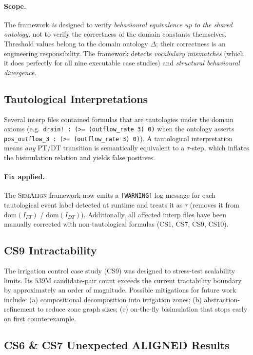 \documentclass[10pt,a4paper]{article}
\newcommand{\tool}{\textsc{SemAlign}}
\begin{document}
\paragraph{Scope.}
The framework \emph{is} designed to verify \emph{behavioural equivalence up
to the shared ontology}, not to verify the correctness of the domain
constants themselves. Threshold values belong to the domain ontology $\Delta$;
their correctness is an engineering responsibility. The framework detects
\emph{vocabulary mismatches} (which it does perfectly for all nine
executable case studies) and \emph{structural behavioural divergence}.

\subsection{Tautological Interpretations}

Several interp files contained formulas that are tautologies under
the domain axioms (e.g.\ \texttt{drain! : (>= (outflow\_rate 3) 0)} when
the ontology asserts \texttt{pos\_outflow\_3 : (>= (outflow\_rate 3) 0)}).
A tautological interpretation means \emph{any} PT/DT transition is
semantically equivalent to a $\tau$-step, which inflates the bisimulation
relation and yields false positives.

\paragraph{Fix applied.}
The \tool{} framework now emits a \texttt{[WARNING]} log message for each
tautological event label detected at runtime and treats it as $\tau$
(removes it from $\text{dom}(I_{PT})$ / $\text{dom}(I_{DT})$).
Additionally, all affected interp files have been manually corrected with
non-tautological formulas (CS1, CS7, CS9, CS10).

\subsection{CS9 Intractability}

The irrigation control case study (CS9) was designed to stress-test
scalability limits. Its $539$M candidate-pair count exceeds the current
tractability boundary by approximately an order of magnitude.
Possible mitigations for future work include:
(a) compositional decomposition into irrigation zones;
(b) abstraction-refinement to reduce zone graph sizes;
(c) on-the-fly bisimulation that stops early on first counterexample.

\subsection{CS6 \& CS7 Unexpected ALIGNED Results}
\end{document}
